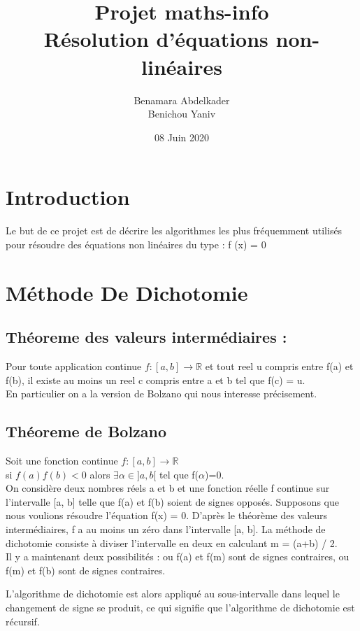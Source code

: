 \documentclass{article}
\author{Benamara Abdelkader \\ Benichou Yaniv }
\date{08 Juin 2020}
\newcommand{\R}{\mathbb{R}}
\begin{document}
\title{Projet maths-info \\ 
Résolution d'équations non-linéaires}
\maketitle

\newpage
\tableofcontents
\newpage

\section{Introduction}
    Le but de ce projet est de décrire les algorithmes les plus fréquemment utilisés pour résoudre des équations non linéaires du type :
                         f (x) = 0
\newpage


\section{Méthode De Dichotomie}
\subsection{Théoreme des valeurs intermédiaires :}
Pour toute application continue $ f : [a, b] \to \R $ et tout reel u compris entre f(a) et f(b), il existe au moins un reel c compris entre a et b tel que f(c) = u. \\
En particulier on a la version de Bolzano qui nous interesse précisement.

\subsection{Théoreme de Bolzano}
Soit une fonction continue $ f : [a, b] \to \R $ \\
si $ f(a)f(b) < 0 $  alors $ \exists \alpha \in  ]a, b[ $ tel que f($\alpha$)=0. \\ 


On considère deux nombres réels a et b et une fonction réelle f continue sur l'intervalle [a, b] telle que f(a) et f(b) soient de signes opposés. Supposons que nous voulions résoudre l'équation f(x) = 0. D'après le théorème des valeurs intermédiaires, f a au moins un zéro dans l’intervalle [a, b]. La méthode de dichotomie consiste à diviser l’intervalle en deux en calculant m = (a+b) / 2. \\
Il y a maintenant deux possibilités : ou f(a) et f(m) sont de signes contraires, ou f(m) et f(b) sont de signes contraires.

L’algorithme de dichotomie est alors appliqué au sous-intervalle dans lequel le changement de signe se produit, ce qui signifie que l’algorithme de dichotomie est récursif.
\end{document}
